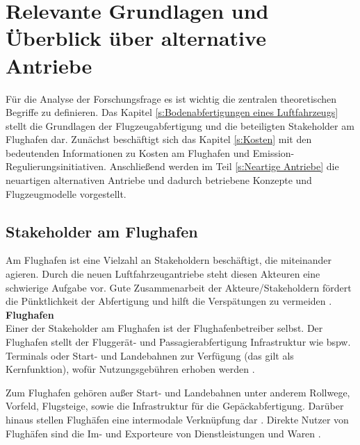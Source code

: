 \chapter{Relevante Grundlagen und Überblick über alternative Antriebe}
\label{ch:Relevante Grundlagen und Überblick über alternative Antriebe}
Für die Analyse der Forschungsfrage es ist wichtig die zentralen theoretischen Begriffe zu definieren. 
Das Kapitel \ref{s:Bodenabfertigungen eines Luftfahrzeugs} stellt die Grundlagen der Flugzeugabfertigung und 
die beteiligten Stakeholder am Flughafen dar. Zunächst beschäftigt sich das Kapitel \ref{s:Kosten}
mit den bedeutenden Informationen zu Kosten am Flughafen und Emission-Regulierungsinitiativen. 
Anschließend werden im Teil \ref{s:Neartige Antriebe}
die neuartigen alternativen Antriebe und dadurch betriebene Konzepte und Flugzeugmodelle vorgestellt.

\section{Stakeholder am Flughafen}
\label{s:Stakeholder am Flughafen}

Am Flughafen ist eine Vielzahl an Stakeholdern beschäftigt, die miteinander agieren. 
Durch die neuen Luftfahrzeugantriebe steht diesen Akteuren eine 
schwierige Aufgabe vor. Gute Zusammenarbeit der Akteure/Stakeholdern fördert die Pünktlichkeit der Abfertigung und hilft die 
Verspätungen zu vermeiden \cite{schmidt2016challenges}.\\

\textbf{Flughafen} \\
Einer der Stakeholder am Flughafen ist der Flughafenbetreiber selbst. 
Der Flughafen stellt der Fluggerät- und Passagierabfertigung Infrastruktur wie bspw. Terminals oder Start- und Landebahnen zur Verfügung (das gilt als Kernfunktion), 
wofür Nutzungsgebühren erhoben werden \cite{conrady2019luftverkehr}. %

Zum Flughafen gehören außer Start- und Landebahnen unter anderem Rollwege, Vorfeld, Flugsteige, sowie die Infrastruktur für die Gepäckabfertigung. 
%
Darüber hinaus stellen Flughäfen eine intermodale Verknüpfung dar \cite{conrady2019luftverkehr}. %
Direkte Nutzer von Flughäfen sind die Im- und Exporteure von Dienstleistungen und Waren \cite{schaar2010analysis}. 

